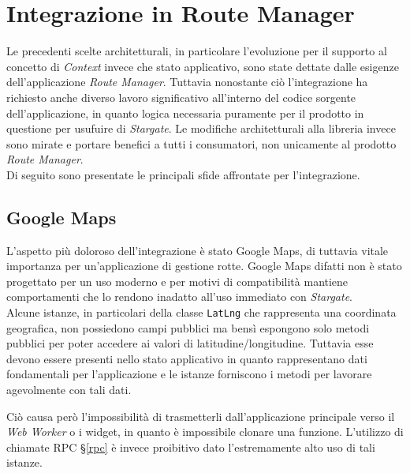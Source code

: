 
\chapter{Integrazione in Route Manager}
\label{cap:integrazione}

Le precedenti scelte architetturali, in particolare l'evoluzione per il supporto al concetto di \textit{Context} invece che stato applicativo, sono state dettate dalle esigenze dell'applicazione \textit{Route Manager}. Tuttavia nonostante ciò l'integrazione ha richiesto anche diverso lavoro significativo all'interno del codice sorgente dell'applicazione, in quanto logica necessaria puramente per il prodotto in questione per usufuire di \textit{Stargate}. Le modifiche architetturali alla libreria invece sono mirate e portare benefici a tutti i consumatori, non unicamente al prodotto \textit{Route Manager}. \\

Di seguito sono presentate le principali sfide affrontate per l'integrazione.

\section{Google Maps}

L'aspetto più doloroso dell'integrazione è stato Google Maps, di tuttavia vitale importanza per un'applicazione di gestione rotte. Google Maps difatti non è stato progettato per un uso moderno e per motivi di compatibilità mantiene comportamenti che lo rendono inadatto all'uso immediato con \textit{Stargate}. \\

Alcune istanze, in particolari della classe \texttt{LatLng} che rappresenta una coordinata geografica, non possiedono campi pubblici ma bensì espongono solo metodi pubblici per poter accedere ai valori di latitudine/longitudine. Tuttavia esse devono essere presenti nello stato applicativo in quanto rappresentano dati fondamentali per l'applicazione e le istanze forniscono i metodi per lavorare agevolmente con tali dati.

Ciò causa però l'impossibilità di trasmetterli dall'applicazione principale verso il \textit{Web Worker} o i widget, in quanto è impossibile clonare una funzione. L'utilizzo di chiamate RPC §\ref{rpc} è invece proibitivo dato l'estremamente alto uso di tali istanze. \\

